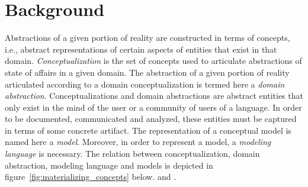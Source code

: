 \documentclass[
	10pt,				%
	oneside,
	a4paper,			%
	brazil,
	english
	]{abntex2}
\begin{document}
%

\section{Background}




Abstractions of a given portion of reality are constructed in terms of
concepts, i.e., abstract representations of certain aspects of entities that
exist in that domain.
%
\emph{Conceptualization} is the set of concepts used to articulate abstractions
of state of affairs in a given domain. The abstraction of a given portion of
reality articulated according to a domain conceptualization is termed here a
\emph{domain abstraction}.
%
Conceptualizations and domain abstractions are abstract entities that only exist
in the mind of the user or a community of users of a language. In order to be
documented, communicated and analyzed, these entities must be captured
in terms of some concrete artifact.
%
The representation of a conceptual model is named here a \emph{model}.
Moreover, in order to represent a model, a \emph{modeling language} is necessary.
%
The relation between conceptualization, domain abstraction, modeling language and
models is depicted in figure~\ref{fig:materializing_concepts} below.
\cite{carraretto10} and \cite{guizzardi05}.
\end{document}
